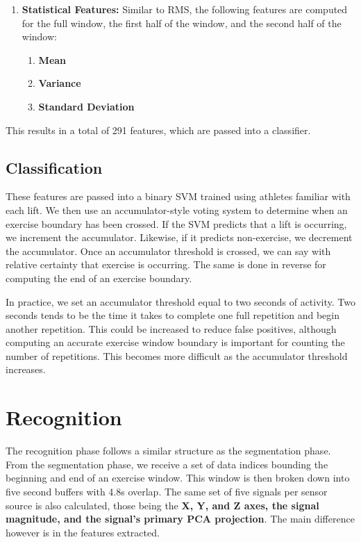 \begin{enumerate}
\begin{enumerate}
    \end{enumerate}
    \item \textbf{Statistical Features:} Similar to RMS, the following features are computed for the full window, the first half of the window, and the second half of the window: 
    \begin{enumerate}
        \item \textbf{Mean} 
        \item \textbf{Variance}
        \item \textbf{Standard Deviation}
    \end{enumerate}
\end{enumerate}

This results in a total of 291 features, which are passed into a classifier. 

\subsection{Classification}
These features are passed into a binary SVM trained using athletes familiar with each lift. We then use an accumulator-style voting system to determine when an exercise boundary has been crossed. If the SVM predicts that a lift is occurring, we increment the accumulator. Likewise, if it predicts non-exercise, we decrement the accumulator. Once an accumulator threshold is crossed, we can say with relative certainty that exercise is occurring. The same is done in reverse for computing the end of an exercise boundary.

In practice, we set an accumulator threshold equal to two seconds of activity. Two seconds tends to be the time it takes to complete one full repetition and begin another repetition. This could be increased to reduce false positives, although computing an accurate exercise window boundary is important for counting the number of repetitions. This becomes more difficult as the accumulator threshold increases.

\section{Recognition}

The recognition phase follows a similar structure as the segmentation phase. From the segmentation phase, we receive a set of data indices bounding the beginning and end of an exercise window. This window is then broken down into five second buffers with 4.8s overlap. The same set of five signals per sensor source is also calculated, those being the \textbf{X, Y, and Z axes, the signal magnitude, and the signal's primary PCA projection}. The main difference however is in the features extracted.

